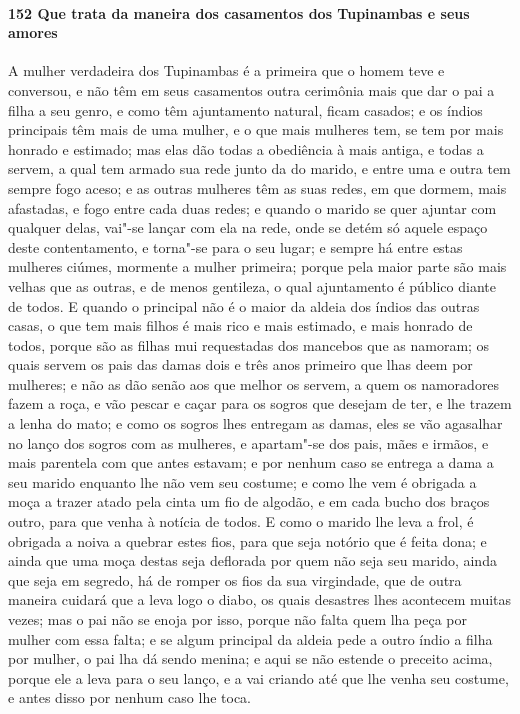 \begin{linenumbers}
\paragraph{152 Que trata da maneira dos casamentos dos Tupinambas e seus amores}\quad
A mulher verdadeira dos Tupinambas é a primeira que o homem teve e conversou, e não têm em
seus casamentos outra cerimônia mais que dar o pai a filha a seu genro, e como têm
ajuntamento natural, ficam casados; e os índios principais têm mais de uma mulher, e o que
mais mulheres tem, se tem por mais honrado e estimado; mas elas dão todas a obediência à
mais antiga, e todas a servem, a qual tem armado sua rede junto da do marido, e entre uma
e outra tem sempre fogo aceso; e as outras mulheres têm as suas redes, em que dormem, mais
afastadas, e fogo entre cada duas redes; e quando o marido se quer ajuntar com qualquer
delas, vai"-se lançar com ela na rede, onde se detém só aquele espaço deste contentamento,
e torna"-se para o seu lugar; e sempre há entre estas mulheres ciúmes, mormente a mulher
primeira; porque pela maior parte são mais velhas que as outras, e de menos gentileza, o
qual ajuntamento é público diante de todos. E quando o principal não é o maior da aldeia
dos índios das outras casas, o que tem mais filhos é mais rico e mais estimado, e mais
honrado de todos, porque são as filhas mui requestadas dos mancebos que as namoram; os
quais servem os pais das damas dois e três anos primeiro que lhas deem por mulheres; e não
as dão senão aos que melhor os servem, a quem os namoradores fazem a roça, e vão pescar e
caçar para os sogros que desejam de ter, e lhe trazem a lenha do mato; e como os sogros
lhes entregam as damas, eles se vão agasalhar no lanço dos sogros com as mulheres, e
apartam"-se dos pais, mães e irmãos, e mais parentela com que antes estavam; e por nenhum
caso se entrega a dama a seu marido enquanto lhe não vem seu costume; e como lhe vem é
obrigada a moça a trazer atado pela cinta um fio de algodão, e em cada bucho dos braços
outro, para que venha à notícia de todos. E como o marido lhe leva a frol, é obrigada a
noiva a quebrar estes fios, para que seja notório que é feita dona; e ainda que uma moça
destas seja deflorada por quem não seja seu marido, ainda que seja em segredo, há de
romper os fios da sua virgindade, que de outra maneira cuidará que a leva logo o diabo, os
quais desastres lhes acontecem muitas vezes; mas o pai não se enoja por isso, porque não
falta quem lha peça por mulher com essa falta; e se algum principal da aldeia pede a outro
índio a filha por mulher, o pai lha dá sendo menina; e aqui se não estende o preceito
acima, porque ele a leva para o seu lanço, e a vai criando até que lhe venha seu costume,
e antes disso por nenhum caso lhe toca.


\end{linenumbers}
